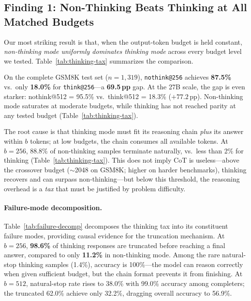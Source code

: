 \subsection{Finding 1: Non-Thinking Beats Thinking at All Matched Budgets}
\label{sec:finding:tax}

Our most striking result is that, when the output-token budget is held
constant, \emph{non-thinking mode uniformly dominates thinking mode}
across every budget level we tested.
Table~\ref{tab:thinking-tax} summarizes the comparison.



On the complete GSM8K test set ($n{=}1{,}319$),
\texttt{nothink@256} achieves \textbf{87.5\%} vs.\ only
\textbf{18.0\%} for \texttt{think@256}---a \textbf{69.5\,pp} gap.
At the 27B scale, the gap is even starker: nothink@512 = 95.5\% vs.\ think@512 = 18.3\% ($+77.2$\,pp).
Non-thinking mode saturates at moderate budgets, while thinking has not reached parity at any tested budget (Table~\ref{tab:thinking-tax}).

The root cause is that thinking mode must fit its reasoning chain \emph{plus} its answer within $b$ tokens; at low budgets, the chain consumes all available tokens.
At $b{=}256$, 88.8\% of non-thinking samples terminate naturally, vs.\ less than 2\% for thinking (Table~\ref{tab:thinking-tax}).
This does not imply CoT is useless---above the crossover budget (${\sim}$2048 on GSM8K; higher on harder benchmarks), thinking recovers and can surpass non-thinking---but below this threshold, the reasoning overhead is a \emph{tax} that must be justified by problem difficulty.

\paragraph{Failure-mode decomposition.}
Table~\ref{tab:failure-decomp} decomposes the thinking tax into its constituent
failure modes, providing causal evidence for the truncation mechanism.
At $b{=}256$, \textbf{98.6\%} of thinking responses are truncated before
reaching a final answer, compared to only \textbf{11.2\%} in non-thinking mode.
Among the rare natural-stop thinking samples (1.4\%), accuracy is 100\%---the
model can reason correctly when given sufficient budget, but the chain
format prevents it from finishing.
At $b{=}512$, natural-stop rate rises to 38.0\% with 99.0\% accuracy among
completers; the truncated 62.0\% achieve only 32.2\%, dragging overall
accuracy to 56.9\%.


